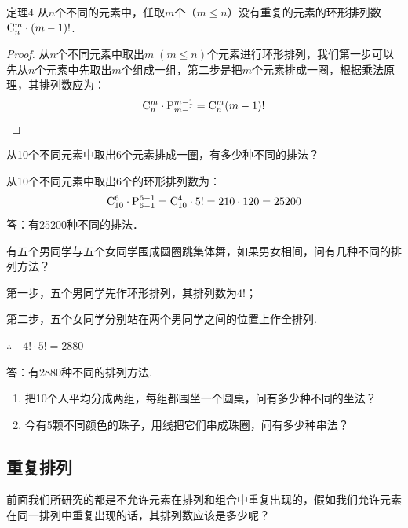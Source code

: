 \begin{blk}
  {定理4} 从$n$个不同的元素中，任取$m$个（$m\le n$）没有重复的元素的环形排列数${\rm C}^{m}_{n}\cdot (m-1)!$.  
\end{blk}

\begin{proof}
    从$n$个不同元素中取出$m\; (m\le n)$个元素进行环形排列，我们第一步可以先从$n$个元素中先取出$m$个组成一组，第二步是把$m$个元素排成一圈，根据乘法原理，其排列数应为：
\[{\rm C}^{m}_{n}\cdot {\rm P}^{m-1}_{m-1}={\rm C}^{m}_{n}(m-1)!\]
\end{proof}

\begin{example}
    从10个不同元素中取出6个元素排成一圈，有多少种不同的排法？
\end{example}

\begin{solution}
    从10个不同元素中取出6个的环形排列数为：
\[{\rm C}^{6}_{10}\cdot{\rm P}^{6-1}_{6-1}={\rm C}^{4}_{10}\cdot  5!=210\cdot 120=25200\]
答：有25200种不同的排法．
\end{solution}

\begin{example}
    有五个男同学与五个女同学围成圆圈跳集体舞，如果男女相间，问有几种不同的排列方法？
\end{example}

\begin{solution}
第一步，五个男同学先作环形排列，其排列数为$4!$；

第二步，五个女同学分别站在两个男同学之间的位置上作全排列.

$\therefore\quad 4! \cdot 5! =2880$

答：有2880种不同的排列方法.    
\end{solution}

\begin{ex}
\begin{enumerate}
\item 把10个人平均分成两组，每组都围坐一个圆桌，问有多少种不同的坐法？
\item 今有5颗不同颜色的珠子，用线把它们串成珠圈，问有多少种串法？
\end{enumerate}
\end{ex}

\subsection{重复排列}

前面我们所研究的都是不允许元素在排列和组合中重复出现的，假如我们允许元素在同一排列中重复出现的话，其排列数应该是多少呢？

